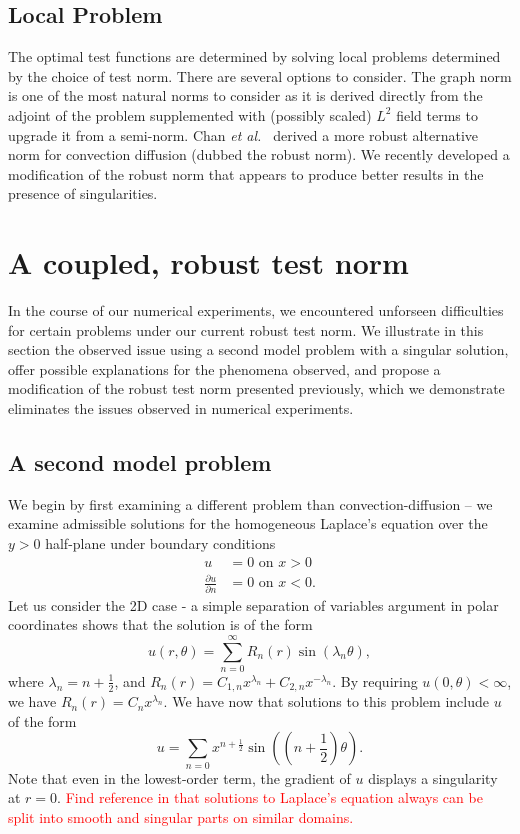 \documentclass[letterpaper]{article}
\newcommand{\seclab}[1]{\label{sec:#1}}
\newcommand{\LRp}[1]{\left( #1 \right)}
\def\etal{{\it et al.~}}
\newcommand{\pd}[2]{\frac{\partial#1}{\partial#2}}
\begin{document}
\subsection{Local Problem}
The optimal test functions are determined by solving local problems determined
by the choice of test norm. There are several options to consider.
The graph norm \cite{DPGOverview} is one of the most natural norms to consider
as it is derived directly from the adjoint of the problem supplemented with
(possibly scaled) $L^2$ field terms to upgrade it from a semi-norm. 
Chan \etal\cite{ChanHeuerThanhDemkowicz2012} derived a more robust alternative
norm for convection diffusion (dubbed the robust norm). We recently
developed a modification of the robust norm that appears to produce better
results in the presence of singularities.

\section{A coupled, robust test norm}
In the course of our numerical experiments, we encountered unforseen
difficulties for certain problems under our current robust test norm.  We
illustrate in this section the observed issue using a second model problem
with a singular solution, offer possible explanations for the phenomena
observed, and propose a modification of the robust test norm presented
previously, which we demonstrate eliminates the issues observed in numerical
experiments.  


\subsection{A second model problem}
\seclab{sec:confusionPlate}
We begin by first examining a different problem than convection-diffusion --
we examine admissible solutions for the homogeneous Laplace's equation over
the $y > 0$ half-plane under boundary conditions 
\begin{align*}
u &= 0 \text{ on } x > 0\\
\pd{u}{n} &= 0 \text{ on } x < 0.
\end{align*}
Let us consider the 2D case - a simple separation of variables argument in
polar coordinates shows that the solution is of the form
\[
u(r,\theta) = \sum_{n=0}^\infty R_n(r) \sin(\lambda_n \theta),
\]
where $\lambda_n = n + \frac{1}{2}$, and $R_n(r) = C_{1,n}x^{\lambda_n} + C_{2,n}x^{-\lambda_n}$.  By requiring $u(0,\theta) < \infty$, we have $R_n(r) = C_n x^{\lambda_n}$.  We have now that solutions to this problem include $u$ of the form
\[
u = \sum_{n=0} x^{n+\frac{1}{2}} \sin\LRp{\LRp{n+\frac{1}{2}}\theta}.
\]
Note that even in the lowest-order term, the gradient of $u$ displays a
singularity at $r = 0$.  \textcolor{red}{Find reference in that solutions to
Laplace's equation always can be split into smooth and singular parts on
similar domains.}  
\end{document}
